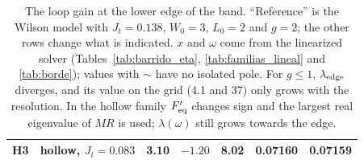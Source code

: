 \documentclass[11pt,a4paper]{article}
\begin{document}
\begin{table}[!htbp]
\begin{tabular}{llrrrrr}
H3 & hollow, $J_t=0.083$ & 3.10 & $-1.20$ & 8.02 & 0.07160 & 0.07159\\
\bottomrule
\end{tabular}
\caption{The loop gain at the lower edge of the band. ``Reference'' is the Wilson model with
$J_t=0.138$, $W_0=3$, $L_0=2$ and $g=2$; the other rows change what is indicated. $x$ and $\omega$
come from the linearized solver (Tables~\ref{tab:barrido_eta}, \ref{tab:familias_lineal} and
\ref{tab:borde}); values with $\sim$ have no isolated pole. For $g\le1$, $\lambda_{\rm edge}$ diverges, and
its value on the grid (4.1 and 37) only grows with the resolution. In the hollow family
$F_{\rm eq}'$ changes sign and the largest real eigenvalue of $MR$ is used; $\lambda(\omega)$ still grows
towards the edge.}
\label{tab:lazo}
\end{table}
\end{document}
